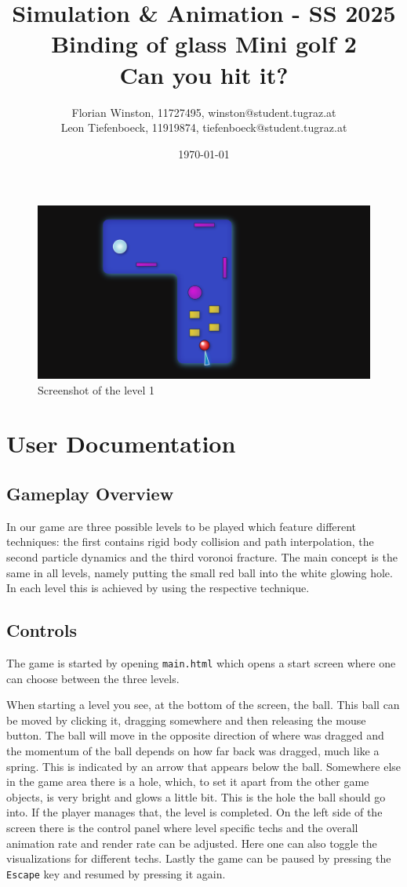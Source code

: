 \documentclass{article}
\title{	
	\large Simulation \& Animation - SS 2025\\
	\Huge{Binding of glass Mini golf 2}\\
	\huge{Can you hit it?}
}
\author{\parbox{\textwidth}{\centering
	Florian Winston, 11727495, winston@student.tugraz.at\\%
	Leon Tiefenboeck, 11919874, tiefenboeck@student.tugraz.at\\%
}}
\date{\today}
\begin{document}
\maketitle

\begin{figure}[H]
    \includegraphics[width=\textwidth]{showcase.png}
    \caption{Screenshot of the level 1}
\end{figure}

\section{User Documentation}

\subsection{Gameplay Overview}

In our game are three possible levels to be played which feature different techniques: the first contains rigid body collision and path interpolation, the second particle dynamics and the third voronoi fracture. 
The main concept is the same in all levels, namely putting the small red ball into the white glowing hole. 
In each level this is achieved by using the respective technique.

\subsection{Controls}

The game is started by opening \texttt{main.html} which opens a 
start screen where one can choose between the three levels. 

When starting a level you see, at the bottom of the screen, the ball. This ball can be moved 
by clicking it, dragging somewhere and then releasing the mouse button. 
The ball will move in the opposite direction of where was dragged and the momentum of the 
ball depends on how far back was dragged, much like a spring. This is indicated by an arrow that appears below the ball.
Somewhere else in the game area there is a hole, which, to set it apart from the other game objects, 
is very bright and glows a little bit. This is the hole 
the ball should go into. If the player manages that, the level is completed.
On the left side of the screen there is the control panel where level specific techs 
and the overall animation rate and render rate can be adjusted. Here one can also toggle the visualizations 
for different techs. 
Lastly the game can be paused by pressing the \texttt{Escape} key and resumed by pressing it again.
\end{document}
